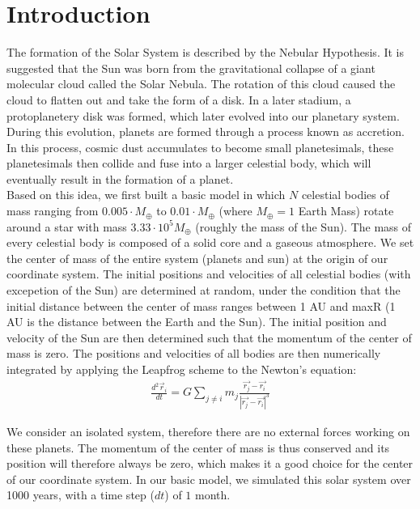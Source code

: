 \section{Introduction}
The formation of the Solar System is described by the Nebular Hypothesis. It is suggested that the Sun was born from the gravitational collapse of a giant molecular cloud called the Solar Nebula. 
The rotation of this cloud caused the cloud to flatten out and take the form of a disk. In a later stadium, a protoplanetery disk was formed, which later evolved into our planetary system.
During this evolution, planets are formed through a process known as accretion.
In this process, cosmic dust accumulates to become small planetesimals, these planetesimals then collide and fuse into a larger celestial body, which will eventually result in the formation of a planet.\\

Based on this idea, we first built a basic model in which \(N\) celestial bodies of mass ranging from $0.005\cdot M_{\oplus}$ to $0.01\cdot M_{\oplus}$ (where $M_{\oplus}=1$ Earth Mass) rotate around a star with mass $3.33\cdot 10^5 M_{\oplus}$ (roughly the mass of the Sun).
The mass of every celestial body is composed of a solid core and a gaseous atmosphere.
We set the center of mass of the entire system (planets and sun) at the origin of our coordinate system. 
The initial positions and velocities of all celestial bodies (with excepetion of the Sun) are determined at random, under the condition that the initial distance between the center of mass ranges between 1 AU and  maxR (1 AU is the distance between the Earth and the Sun). 
The initial position and velocity of the Sun are then determined such that the momentum of the center of mass is zero. 
The positions and velocities of all bodies are then numerically integrated by applying the Leapfrog scheme to the Newton's equation:
\begin{align}
\frac{d^2\vec{r}_i}{dt}=G\sum_{j\neq i}m_j\frac{\vec{r_j}-\vec{r_i}}{|\vec{r_j}-\vec{r_i}|^3}
\end{align}

We consider an isolated system, therefore there are no external forces working on these planets. 
The momentum of the center of mass is thus conserved and its position will therefore always be zero, which makes it a good choice for the center of our coordinate system. 
In our basic model, we simulated this solar system over 1000 years, with a time step (\(dt\)) of $1$ month.\\

